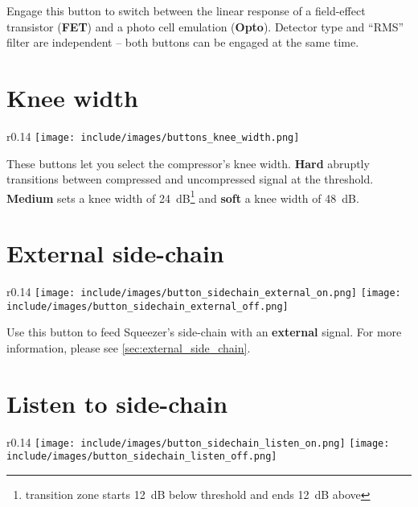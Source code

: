 Engage this button to switch between the linear response of a
field-effect transistor (\textbf{FET}) and a photo cell emulation
(\textbf{Opto}).  Detector type and ``RMS'' filter are independent --
both buttons can be engaged at the same time.

\section{Knee width}

\begin{wrapfigure}{r}{0.14\linewidth}
  \texttt{[image: include/images/buttons\_knee\_width.png]}
\end{wrapfigure}

These buttons let you select the compressor's knee width.
\textbf{Hard} abruptly transitions between compressed and uncompressed
signal at the threshold.  \textbf{Medium} sets a knee width of
\SI{24}{\dB}\footnote{transition zone starts \SI{12}{\dB} below
  threshold and ends \SI{12}{\dB} above} and \textbf{soft} a knee
width of \SI{48}{\dB}.

\section{External side-chain}

\begin{wrapfigure}{r}{0.14\linewidth}
  \texttt{[image: include/images/button\_sidechain\_external\_on.png]}
  \newline \vspace{-0.9\baselineskip}
  \texttt{[image: include/images/button\_sidechain\_external\_off.png]}
\end{wrapfigure}

Use this button to feed Squeezer's side-chain with an
\textbf{external} signal.  For more information, please see
\ref{sec:external_side_chain}.

\section{Listen to side-chain}

\begin{wrapfigure}{r}{0.14\linewidth}
  \texttt{[image: include/images/button\_sidechain\_listen\_on.png]}
  \newline \vspace{-0.9\baselineskip}
  \texttt{[image: include/images/button\_sidechain\_listen\_off.png]}
\end{wrapfigure}

